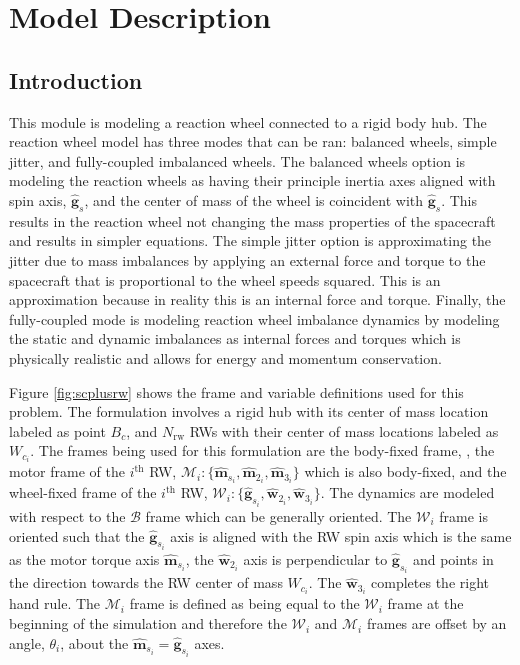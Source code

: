 \section{Model Description}

\subsection{Introduction}

This module is modeling a reaction wheel connected to a rigid body hub. The reaction wheel model has three modes that can be ran: balanced wheels, simple jitter, and fully-coupled imbalanced wheels. The balanced wheels option is modeling the reaction wheels as having their principle inertia axes aligned with spin axis, $\hat{\bm g}_s$, and the center of mass of the wheel is coincident with $\hat{\bm g}_s$. This results in the reaction wheel not changing the mass properties of the spacecraft and results in simpler equations. The simple jitter option is approximating the jitter due to mass imbalances by applying an external force and torque to the spacecraft that is proportional to the wheel speeds squared. This is an approximation because in reality this is an internal force and torque. Finally, the fully-coupled mode is modeling reaction wheel imbalance dynamics by modeling the static and dynamic imbalances as internal forces and torques which is physically realistic and allows for energy and momentum conservation.

Figure \ref{fig:scplusrw} shows the frame and variable definitions used for this problem. The formulation involves a rigid hub with its center of mass location labeled as point $B_c$, and $N_\text{rw}$ RWs with their center of mass locations labeled as $W_{c_i}$. The frames being used for this formulation are the body-fixed frame, , the motor frame of the $i^\text{th}$ RW, $\mathcal{M}_i:\{\hat{\bm m}_{s_i},\hat{\bm m}_{2_i},\hat{\bm m}_{3_i}\}$ which is also body-fixed, and the wheel-fixed frame of the $i^\text{th}$ RW, $\mathcal{W}_i:\{\hat{\bm g}_{s_i},\hat{\bm w}_{2_i},\hat{\bm w}_{3_i}\}$. The dynamics are modeled with respect to the $\mathcal{B}$ frame which can be generally oriented. The $\mathcal{W}_i$ frame is oriented such that the $\hat{\bm g}_{s_i}$ axis is aligned with the RW spin axis  which is the same as the motor torque axis $\hat{\bm m}_{s_{i}}$, the $\hat{\bm w}_{2_i}$ axis is perpendicular to $\hat{\bm g}_{s_i}$ and points in the direction towards the RW center of mass $W_{c_i}$. The $\hat{\bm w}_{3_i}$ completes the right hand rule. The $\mathcal{M}_i$ frame is defined as being equal to the $\mathcal{W}_i$ frame at the beginning of the simulation and therefore the $\mathcal{W}_i$ and $\mathcal{M}_i$ frames are offset by an angle, $\theta_i$, about the $\hat{\bm m}_{s_i} = \hat{\bm g}_{s_i}$ axes.

